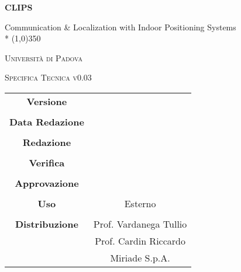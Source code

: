 \documentclass[a4paper,12pt]{article}
\author{}
\date{03/03/2016}
\begin{document}
\begin{titlepage}
	\centering
	{\huge\bfseries CLIPS\par}
	Communication \& Localization with Indoor Positioning Systems \\*
	\line(1,0){350} \\
	{\scshape\LARGE Università di Padova \par}
	\vspace{1cm}
	{\scshape\Large Specifica Tecnica v0.03 \par}
	\logo
	\newpage
		\begin{tabular}{c|c}
			{\hfill \textbf{Versione}} 			& 					\\ \\
			{\hfill\textbf{Data Redazione}} 	&            		\\ \\
			{\hfill\textbf{Redazione}} 			&  					\\ \\
			{\hfill\textbf{Verifica}} 			&  					\\ \\
			{\hfill\textbf{Approvazione}} 		&  					\\ \\
			{\hfill\textbf{Uso}} 				& Esterno			\\ \\
			{\hfill\textbf{Distribuzione}} 		& Prof. Vardanega Tullio \\
												& Prof. Cardin Riccardo \\
												& Miriade S.p.A. \\
		\end{tabular}
	\end{titlepage}
	
	\newpage
	\pagestyle{myfront}
		
	\newpage
		\tableofcontents
	\newpage
		\listoffigures	
	\label{LastFrontPage}
	\newpage
	
	\pagestyle{mymain}
	
	 \newpage
		

	\newpage
		
	
	\newpage
		
	
	\newpage
		
	
	\newpage
		
	
	\newpage
		
	
	\newpage
		
	
	\newpage
		

	\newpage
		
	
	\newpage
		
	
	\newpage
		

		
	\label{LastPage}
\end{document}
